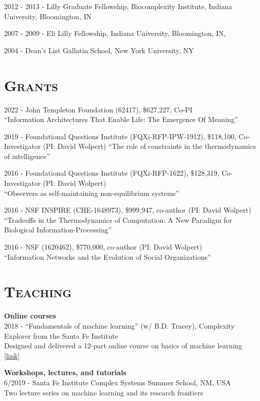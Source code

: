 \documentclass[margin,line,centered]{res}
\begin{document}
\begin{resume}
2012 - 2013 - Lilly Graduate Fellowship, Biocomplexity Institute, Indiana University, Bloomington, IN

2007 - 2009 - Eli Lilly Fellowship, Indiana University, Bloomington, IN, 

2004 - Dean's List Gallatin School, New York University, NY

\section{\textsc{Grants}}

2022 - John Templeton Foundation (62417), \$627,227, Co-PI\\
``Information Architectures That Enable Life: The Emergence Of Meaning''

2019 - Foundational Questions Institute (FQXi-RFP-IPW-1912),  \$118,100, Co-Investigator (PI: David Wolpert)
``The role of constraints in the thermodynamics of intelligence'' 

2016 - Foundational Questions Institute (FQXi-RFP-1622), \$128,319, Co-Investigator (PI: David Wolpert)\\
``Observers as self-maintaining non-equilibrium systems''

2016 - NSF INSPIRE (CHE-1648973), \$999,947, co-author (PI: David Wolpert)\\
``Tradeoffs in the Thermodynamics of Computation: A New Paradigm for Biological Information-Processing''

2016 - NSF (1620462), \$770,000, co-author (PI: David Wolpert)\\
``Information Networks and the Evolution of Social Organizations'' 



\section{\textsc{Teaching}}

\textbf{Online courses}\\
2018 - ``Fundamentals of machine learning'' (w/ B.D. Tracey), Complexity Explorer from the Santa Fe Institute\\
Designed and delivered a 12-part online course on basics of machine learning {[}\href{https://www.complexityexplorer.org/courses/81-fundamentals-of-machine-learning}{link}{]}

\vspace{5pt}


\textbf{Workshops, lectures, and tutorials}\\
6/2019 - Santa Fe Institute Complex Systems Summer School, NM, USA\\
Two lecture series on machine learning and its research frontiers


\end{resume}
\end{document}
